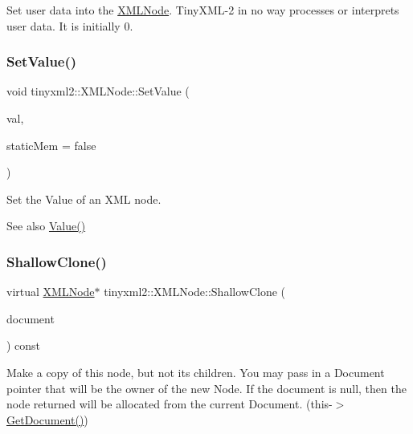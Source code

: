 Set user data into the \mbox{\hyperlink{classtinyxml2_1_1XMLNode}{X\+M\+L\+Node}}. Tiny\+X\+M\+L-\/2 in no way processes or interprets user data. It is initially 0. \mbox{\label{classtinyxml2_1_1XMLNode_a09dd68cf9eae137579f6e50f36487513}} 
\subsubsection{\texorpdfstring{SetValue()}{SetValue()}}
{\footnotesize\ttfamily void tinyxml2\+::\+X\+M\+L\+Node\+::\+Set\+Value (\begin{DoxyParamCaption}\item[{const char $\ast$}]{val,  }\item[{bool}]{static\+Mem = {\ttfamily false} }\end{DoxyParamCaption})}

Set the Value of an X\+ML node. \begin{DoxySeeAlso}{See also}
\mbox{\hyperlink{classtinyxml2_1_1XMLNode_a66344989a4b436155bcda72bd6b07b82}{Value()}} 
\end{DoxySeeAlso}
\mbox{\label{classtinyxml2_1_1XMLNode_a8402cbd3129d20e9e6024bbcc0531283}} 
\subsubsection{\texorpdfstring{ShallowClone()}{ShallowClone()}}
{\footnotesize\ttfamily virtual \mbox{\hyperlink{classtinyxml2_1_1XMLNode}{X\+M\+L\+Node}}$\ast$ tinyxml2\+::\+X\+M\+L\+Node\+::\+Shallow\+Clone (\begin{DoxyParamCaption}\item[{\mbox{\hyperlink{classtinyxml2_1_1XMLDocument}{X\+M\+L\+Document}} $\ast$}]{document }\end{DoxyParamCaption}) const\hspace{0.3cm}{\ttfamily [pure virtual]}}

Make a copy of this node, but not its children. You may pass in a Document pointer that will be the owner of the new Node. If the \textquotesingle{}document\textquotesingle{} is null, then the node returned will be allocated from the current Document. (this-\/$>$\mbox{\hyperlink{classtinyxml2_1_1XMLNode_af343d1ef0b45c0020e62d784d7e67a68}{Get\+Document()}})

